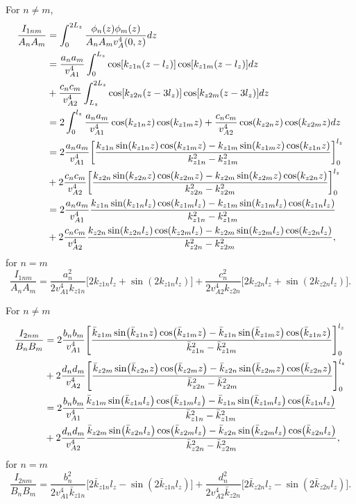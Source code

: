 \documentclass{article}
\begin{document}
For $n\ne m$,
\[\begin{aligned}
\frac{I_{1nm}}{A_n A_m} &= \int_0^{2L_z}\frac{\phi_n(z)\phi_m(z)}{A_n A_mv_A^4(0,z)}dz \\
&= \frac{a_na_m}{v_{A1}^4}\int_0^{L_z} \cos[k_{z1n}(z-l_z)]\cos[k_{z1m}(z-l_z)] dz \\
&+ \frac{c_nc_m}{v_{A2}^4}\int_{L_z}^{2L_z}\cos[k_{z2n}(z-3l_z)]\cos[k_{z2m}(z-3l_z)] dz \\
&= 2\int_{0}^{l_z}\frac{a_na_m}{v_{A1}^4} \cos(k_{z1n}z)\cos(k_{z1m}z) + \frac{c_nc_m}{v_{A2}^4} \cos(k_{z2n}z)\cos(k_{z2m}z) dz \\
&= 2\frac{a_na_m}{v_{A1}^4}\qty[ \frac{k_{z1n}\sin(k_{z1n}z)\cos(k_{z1m}z)-k_{z1m}\sin(k_{z1m}z)\cos(k_{z1n}z)}{k_{z1n}^2-k_{z1m}^2}]_0^{l_z} \\
&+2\frac{c_nc_m}{v_{A2}^4}\qty[\frac{k_{z2n}\sin(k_{z2n}z)\cos(k_{z2m}z)-k_{z2m}\sin(k_{z2m}z)\cos(k_{z2n}z)}{k_{z2n}^2-k_{z2m}^2}]_0^{l_z} \\
&= 2\frac{a_na_m}{v_{A1}^4}\frac{k_{z1n}\sin(k_{z1n}l_z)\cos(k_{z1m}l_z)-k_{z1m}\sin(k_{z1m}l_z)\cos(k_{z1n}l_z)}{k_{z1n}^2-k_{z1m}^2} \\
&+2\frac{c_nc_m}{v_{A2}^4}\frac{k_{z2n}\sin(k_{z2n}l_z)\cos(k_{z2m}l_z)-k_{z2m}\sin(k_{z2m}l_z)\cos(k_{z2n}l_z)}{k_{z2n}^2-k_{z2m}^2}, \\
\end{aligned}\]
for $n=m$
\[\frac{I_{1nm}}{A_nA_m} = \frac{a_n^2}{2v_{A1}^4k_{z1n}}\Big[2k_{z1n}l_z+\sin(2k_{z1n}l_z)\Big]+\frac{c_n^2}{2v_{A2}^4k_{z2n}}\Big[2k_{z2n}l_z+\sin(2k_{z2n}l_z)\Big].\]

For $n\ne m$
\[\begin{aligned}
\frac{I_{2nm}}{B_n B_m} &= 2\frac{b_nb_m}{v_{A1}^4}\qty[ \frac{\bar{k}_{z1m}\sin(\bar{k}_{z1n}z)\cos(\bar{k}_{z1m}z)-\bar{k}_{z1n}\sin(\bar{k}_{z1m}z)\cos(\bar{k}_{z1n}z)}{\bar{k}_{z1n}^2-\bar{k}_{z1m}^2}]_0^{l_z} \\
&+2\frac{d_nd_m}{v_{A2}^4}\qty[\frac{\bar{k}_{z2m}\sin(\bar{k}_{z2n}z)\cos(\bar{k}_{z2m}z)-\bar{k}_{z2n}\sin(\bar{k}_{z2m}z)\cos(\bar{k}_{z2n}z)}{\bar{k}_{z2n}^2-\bar{k}_{z2m}^2}]_0^{l_z} \\
&= 2\frac{b_nb_m}{v_{A1}^4}\frac{\bar{k}_{z1m}\sin(\bar{k}_{z1n}l_z)\cos(\bar{k}_{z1m}l_z)-\bar{k}_{z1n}\sin(\bar{k}_{z1m}l_z)\cos(\bar{k}_{z1n}l_z)}{\bar{k}_{z1n}^2-\bar{k}_{z1m}^2} \\
&+2\frac{d_nd_m}{v_{A2}^4}\frac{\bar{k}_{z2m}\sin(\bar{k}_{z2n}l_z)\cos(\bar{k}_{z2m}l_z)-\bar{k}_{z2n}\sin(\bar{k}_{z2m}l_z)\cos(\bar{k}_{z2n}l_z)}{\bar{k}_{z2n}^2-\bar{k}_{z2m}^2}, \\
\end{aligned}\]
for $n=m$
\[\frac{I_{2nm}}{B_nB_m} = \frac{b_n^2}{2v_{A1}^4\bar{k}_{z1n}}\Big[2\bar{k}_{z1n}l_z-\sin(2\bar{k}_{z1n}l_z)\Big]+\frac{d_n^2}{2v_{A2}^4\bar{k}_{z2n}}\Big[2\bar{k}_{z2n}l_z-\sin(2\bar{k}_{z2n}l_z)\Big].\]
\end{document}
